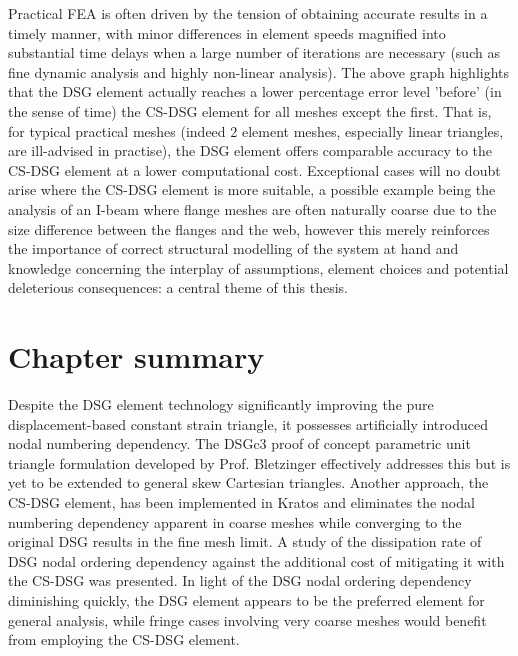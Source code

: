 Practical FEA is often driven by the tension of obtaining accurate results in a timely manner, with minor differences in element speeds magnified into substantial time delays when a large number of iterations are necessary (such as fine dynamic analysis and highly non-linear analysis). The above graph highlights that the DSG element actually reaches a lower percentage error level 'before' (in the sense of time) the CS-DSG element for all meshes except the first. That is, for typical practical meshes (indeed 2 element meshes, especially linear triangles, are ill-advised in practise), the DSG element offers comparable accuracy to the CS-DSG element at a lower computational cost. Exceptional cases will no doubt arise where the CS-DSG element is more suitable, a possible example being the analysis of an I-beam where flange meshes are often naturally coarse due to the size difference between the flanges and the web, however this merely reinforces the importance of correct structural modelling of the system at hand and knowledge concerning the interplay of assumptions, element choices and potential deleterious consequences: a central theme of this thesis.

\section{Chapter summary}
Despite the DSG element technology significantly improving the pure displacement-based constant strain triangle, it possesses artificially introduced nodal numbering dependency. The DSGc3 proof of concept parametric unit triangle formulation developed by Prof. Bletzinger effectively addresses this but is yet to be extended to general skew Cartesian triangles. Another approach, the CS-DSG element, has been implemented in Kratos and eliminates the nodal numbering dependency apparent in coarse meshes while converging to the original DSG results in the fine mesh limit. A study of the dissipation rate of DSG nodal ordering dependency against the additional cost of mitigating it with the CS-DSG was presented. In light of the DSG nodal ordering dependency diminishing quickly, the DSG element appears to be the preferred element for general analysis, while fringe cases involving very coarse meshes would benefit from employing the CS-DSG element.